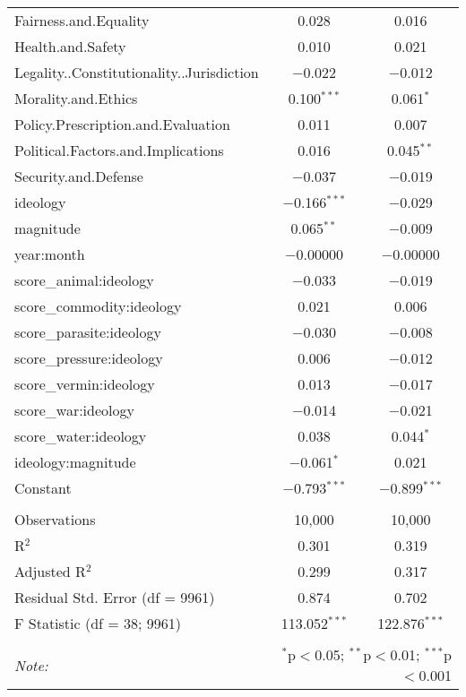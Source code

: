 \begin{table}[!htbp]
\begin{tabular}{@{\extracolsep{5pt}}lcc}
  Fairness.and.Equality & 0.028 & 0.016 \\ 
  Health.and.Safety & 0.010 & 0.021 \\ 
  Legality..Constitutionality..Jurisdiction & $-$0.022 & $-$0.012 \\ 
  Morality.and.Ethics & 0.100$^{***}$ & 0.061$^{*}$ \\ 
  Policy.Prescription.and.Evaluation & 0.011 & 0.007 \\ 
  Political.Factors.and.Implications & 0.016 & 0.045$^{**}$ \\ 
  Security.and.Defense & $-$0.037 & $-$0.019 \\ 
  ideology & $-$0.166$^{***}$ & $-$0.029 \\ 
  magnitude & 0.065$^{**}$ & $-$0.009 \\ 
  year:month & $-$0.00000 & $-$0.00000 \\ 
  score\_animal:ideology & $-$0.033 & $-$0.019 \\ 
  score\_commodity:ideology & 0.021 & 0.006 \\ 
  score\_parasite:ideology & $-$0.030 & $-$0.008 \\ 
  score\_pressure:ideology & 0.006 & $-$0.012 \\ 
  score\_vermin:ideology & 0.013 & $-$0.017 \\ 
  score\_war:ideology & $-$0.014 & $-$0.021 \\ 
  score\_water:ideology & 0.038 & 0.044$^{*}$ \\ 
  ideology:magnitude & $-$0.061$^{*}$ & 0.021 \\ 
  Constant & $-$0.793$^{***}$ & $-$0.899$^{***}$ \\ 
 \hline \\[-1.8ex] 
Observations & 10,000 & 10,000 \\ 
R$^{2}$ & 0.301 & 0.319 \\ 
Adjusted R$^{2}$ & 0.299 & 0.317 \\ 
Residual Std. Error (df = 9961) & 0.874 & 0.702 \\ 
F Statistic (df = 38; 9961) & 113.052$^{***}$ & 122.876$^{***}$ \\ 
\hline 
\hline \\[-1.8ex] 
\textit{Note:}  & \multicolumn{2}{r}{$^{*}$p$<$0.05; $^{**}$p$<$0.01; $^{***}$p$<$0.001} \\ 
\end{tabular} 
\end{table} 
